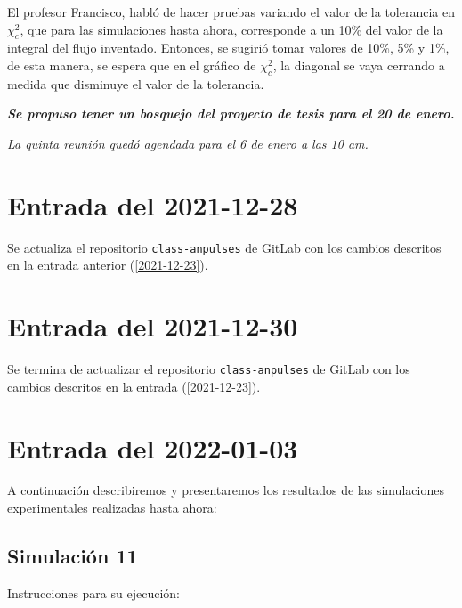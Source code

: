 \documentclass[11pt,letterpaper]{article}
\begin{document}
El profesor Francisco, habló de hacer pruebas variando el valor de la tolerancia en $\chi_c^2$, que para las simulaciones hasta ahora, corresponde a un 10\% del valor de la integral del flujo inventado. Entonces, se sugirió tomar valores de 10\%, 5\% y 1\%, de esta manera, se espera que en el gráfico de $\chi_c^2$, la diagonal se vaya cerrando a medida que disminuye el valor de la tolerancia.

\emph{\textbf{Se propuso tener un bosquejo del proyecto de tesis para el 20 de enero.}}

\emph{La quinta reunión quedó agendada para el 6 de enero a las 10 am.}
\section{Entrada del 2021-12-28}
\label{2021-12-28}

Se actualiza el repositorio \verb|class-anpulses| de GitLab con los cambios descritos en la entrada anterior (\ref{2021-12-23}).


\section{Entrada del 2021-12-30}
\label{2021-12-30}

Se termina de actualizar el repositorio \verb|class-anpulses| de GitLab con los cambios descritos en la entrada (\ref{2021-12-23}).

\section{Entrada del 2022-01-03}
\label{2022-01-03}

A continuación describiremos y presentaremos los resultados de las simulaciones experimentales realizadas hasta ahora:

\subsection*{Simulación 11}

Instrucciones para su ejecución:
\end{document}
